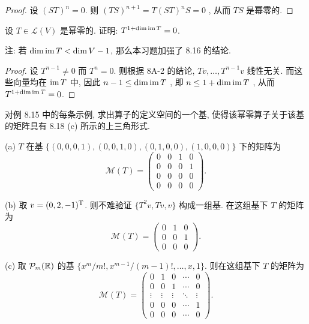 \documentclass{article}
\begin{document}
\begin{proof}
  设 \( (ST)^n=0 \). 则 \( (TS)^{n+1}=T(ST)^nS=0 \) , 从而 \( TS \) 是幂零的.
\end{proof}



\begin{problem}[8A-18]
设 $T \in \mathcal{L}(V)$ 是幂零的. 证明: $T^{1 + \dim \operatorname{im} T} = 0$.

注: 若 $\dim \operatorname{im} T < \dim V - 1$, 那么本习题加强了 8.16 的结论.
\end{problem}

\begin{proof}
  设 \( T^{n-1}\neq 0 \) 而 \( T^n=0 \). 则根据 8A-2 的结论, \( Tv,\dots,T^{n-1}v \) 线性无关. 而这些向量均在 \( \operatorname{im} T \) 中, 因此 \( n-1\le \dim \operatorname{im} T \) , 即 \( n\le 1+\dim \operatorname{im} T \) , 从而 \( T^{1+\dim \operatorname{im} T}=0 \).
\end{proof}



\begin{problem}[8A-24]
对例 8.15 中的每条示例, 求出算子的定义空间的一个基, 使得该幂零算子关于该基的矩阵具有 8.18 (c) 所示的上三角形式.
\end{problem}

\begin{solution}
  (a) \( T \) 在基 \( \{(0,0,0,1),(0,0,1,0),(0,1,0,0),(1,0,0,0)\} \) 下的矩阵为
  \[ \mathcal{M}(T) = \begin{pmatrix}
    0 & 0 & 1 & 0\\
    0 & 0 & 0 & 1\\
    0 & 0 & 0 & 0\\
    0 & 0 & 0 & 0
  \end{pmatrix}. \]  

  (b) 取 \( v=(0,2,-1)^\mathrm{T} \). 则不难验证 \( \{T^2v, Tv, v\} \) 构成一组基. 在这组基下 \( T \) 的矩阵为
  \[ \mathcal{M}(T) = \begin{pmatrix}
    0 & 1 & 0\\
    0 & 0 & 1\\
    0 & 0 & 0
  \end{pmatrix}. \]

  (c) 取 \( \mathcal{P}_m(\mathbb{R}) \) 的基 \( \{x^m/m!,x^{m-1}/(m-1)!,\dots,x,1\} \). 则在这组基下 \( T \) 的矩阵为
  \[ \mathcal{M}(T) = \begin{pmatrix}
    0 & 1 & 0 & \cdots & 0\\
    0 & 0 & 1 & \cdots & 0\\
    \vdots & \vdots & \vdots & \ddots & \vdots\\
    0 & 0 & 0 & \cdots & 1\\
    0 & 0 & 0 & \cdots & 0
  \end{pmatrix}. \]
\end{solution}
\end{document}
